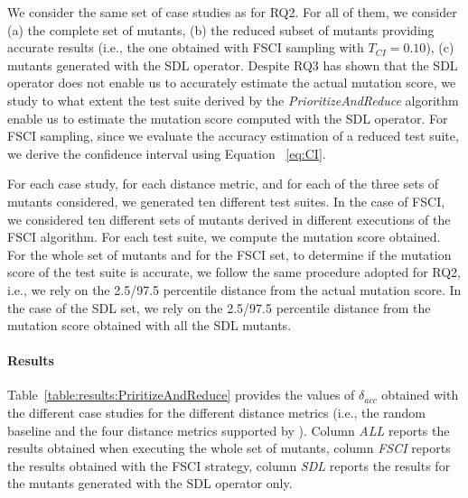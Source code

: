 We consider the same set of case studies as for RQ2.
For all of them, we consider (a) the complete set of mutants, (b) the reduced subset of mutants providing accurate results (i.e., the one obtained with FSCI sampling with $T_{\mathit{CI}}=0.10$), (c) mutants generated with the SDL operator. 
{Despite RQ3 has shown that the SDL operator does not enable us to accurately estimate the actual mutation score, we study to what extent the test suite derived by the \emph{PrioritizeAndReduce} algorithm enable us to estimate the mutation score computed with the SDL operator.}
For FSCI sampling, since we evaluate the accuracy estimation of a reduced test suite, we derive the confidence interval using Equation ~\ref{eq:CI}.


For each case study, for each distance metric, and for each of the three sets of mutants considered, we generated ten different \APPR test suites. In the case of FSCI, we considered ten different sets of mutants derived in different executions of the FSCI algorithm. For each \APPR test suite, we compute the mutation score obtained. For the whole set of mutants and for the FSCI set, to determine if the mutation score of the \APPR test suite is accurate, we follow the same procedure adopted for RQ2, i.e., we rely on the 2.5/97.5 percentile distance from the actual mutation score. In the case of the SDL set, we rely on the 2.5/97.5 percentile distance from the mutation score obtained with all the SDL mutants.


\paragraph{Results}



Table~\ref{table:results:PriritizeAndReduce} provides the values of $\delta_{acc}$ obtained with the different case studies for the different distance metrics (i.e., the random baseline and the four distance metrics supported by \APPR). Column \emph{ALL} reports the results obtained when executing the whole set of mutants, column \emph{FSCI}  reports the results obtained  with the FSCI strategy, column \emph{SDL} reports the results for the mutants generated with the SDL operator only.

